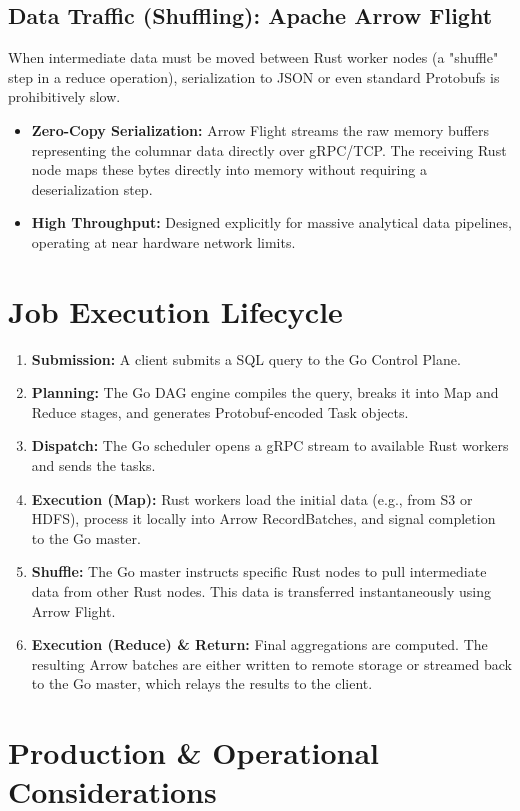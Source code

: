 \documentclass[11pt, a4paper]{article}
\begin{document}
\subsection{Data Traffic (Shuffling): Apache Arrow Flight}
When intermediate data must be moved between Rust worker nodes (a "shuffle" step in a reduce operation), serialization to JSON or even standard Protobufs is prohibitively slow.
\begin{itemize}
    \item \textbf{Zero-Copy Serialization:} Arrow Flight streams the raw memory buffers representing the columnar data directly over gRPC/TCP. The receiving Rust node maps these bytes directly into memory without requiring a deserialization step.
    \item \textbf{High Throughput:} Designed explicitly for massive analytical data pipelines, operating at near hardware network limits.
\end{itemize}

\section{Job Execution Lifecycle}

\begin{enumerate}
    \item \textbf{Submission:} A client submits a SQL query to the Go Control Plane.
    \item \textbf{Planning:} The Go DAG engine compiles the query, breaks it into Map and Reduce stages, and generates Protobuf-encoded Task objects.
    \item \textbf{Dispatch:} The Go scheduler opens a gRPC stream to available Rust workers and sends the tasks.
    \item \textbf{Execution (Map):} Rust workers load the initial data (e.g., from S3 or HDFS), process it locally into Arrow RecordBatches, and signal completion to the Go master.
    \item \textbf{Shuffle:} The Go master instructs specific Rust nodes to pull intermediate data from other Rust nodes. This data is transferred instantaneously using Arrow Flight.
    \item \textbf{Execution (Reduce) \& Return:} Final aggregations are computed. The resulting Arrow batches are either written to remote storage or streamed back to the Go master, which relays the results to the client.
\end{enumerate}

\section{Production \& Operational Considerations}
\end{document}
